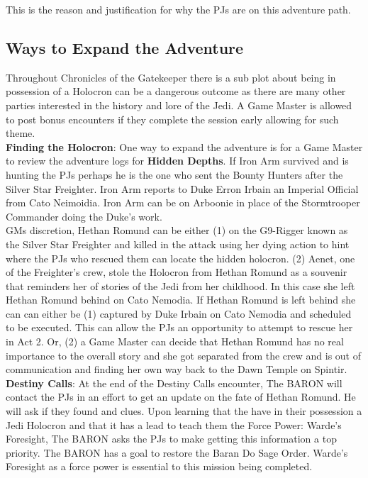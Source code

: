 \documentclass[twoside]{article}
\begin{document}
This is the reason and justification for why the PJs are on this adventure path.

\subsection{Ways to Expand the Adventure}
Throughout Chronicles of the Gatekeeper there is a sub plot about being in possession of a Holocron can be a dangerous outcome as there are many other parties interested in the history and lore of the Jedi.  A Game Master is allowed to post bonus encounters if they complete the session early allowing for such theme.\\

\textbf{Finding the Holocron}: One way to expand the adventure is for a Game Master to review the adventure logs for \textbf{Hidden Depths}.  If Iron Arm survived and is hunting the PJs perhaps he is the one who sent the Bounty Hunters after the Silver Star Freighter.  Iron Arm reports to Duke Erron Irbain an Imperial Official from Cato Neimoidia.  Iron Arm can be on Arboonie in place of the Stormtrooper Commander doing the Duke's work.\\

GMs discretion, Hethan Romund can be either (1) on the G9-Rigger known as the Silver Star Freighter and killed in the attack using her dying action to hint where the PJs who rescued them can locate the hidden holocron.  (2) Aenet, one of the Freighter's crew, stole the Holocron from Hethan Romund as a souvenir that reminders her of stories of the Jedi from her childhood.  In this case she left Hethan Romund behind on Cato Nemodia.  If Hethan Romund is left behind she can can either be (1) captured by Duke Irbain on Cato Nemodia and scheduled to be executed.  This can allow the PJs an opportunity to attempt to rescue her in Act 2.  Or, (2) a Game Master can decide that Hethan Romund has no real importance to the overall story and she got separated from the crew and is out of communication and finding her own way back to the Dawn Temple on Spintir.\\

\textbf{Destiny Calls}:  At the end of the Destiny Calls encounter, The BARON will contact the PJs in an effort to get an update on the fate of Hethan Romund.  He will ask if they found and clues.  Upon learning that the have in their possession a Jedi Holocron and that it has a lead to teach them the Force Power: Warde's Foresight, The BARON asks the PJs to make getting this information a top priority.  The BARON has a goal to restore the Baran Do Sage Order.  Warde's Foresight as a force power is essential to this mission being completed.\\
\end{document}
